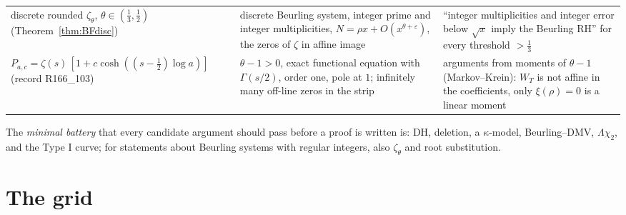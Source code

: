 \documentclass[11pt]{amsart}
\theoremstyle{definition}
\theoremstyle{remark}
\begin{document}
\begin{table}[ht]
\begin{tabularx}{\textwidth}{@{}p{3.3cm}p{4.0cm}Y@{}}
discrete rounded $\zeta_\theta$, $\theta\in(\frac13,\frac12)$ (Theorem~\ref{thm:BFdisc}) & discrete Beurling system, integer prime and integer multiplicities, $N=\rho x+O(x^{\theta+\varepsilon})$, the zeros of $\zeta$ in affine image & ``integer multiplicities and integer error below $\sqrt x$ imply the Beurling RH'' for every threshold $>\frac13$ \\
$P_{a,c}=\zeta(s)\,[1+c\cosh((s-\frac12)\log a)]$ (record R166\_103) & $\theta-1>0$, exact functional equation with $\Gamma(s/2)$, order one, pole at $1$; infinitely many off-line zeros in the strip & arguments from moments of $\theta-1$ (Markov--Krein): $W_T$ is not affine in the coefficients, only $\xi(\rho)=0$ is a linear moment \\
\bottomrule
\end{tabularx}
\end{table}

The \emph{minimal battery} that every candidate argument should pass before a proof is written is: DH,
deletion, a $\kappa$-model, Beurling--DMV, $\Lambda\chi_2$, and the Type I curve; for statements about Beurling systems with regular integers, also $\zeta_\theta$ and root substitution.

\section{The grid}\label{sec:grid}
\end{document}
